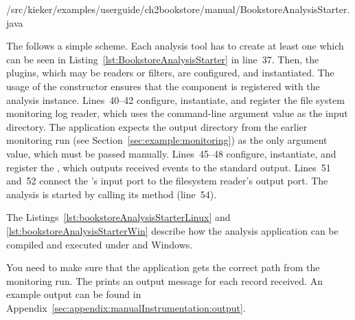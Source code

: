 \pagebreak

\setJavaCodeListing
%
{\manualInstrumentedBookstoreApplicationDir/src/kieker/examples/userguide/ch2bookstore/manual/BookstoreAnalysisStarter.java}


\noindent The  follows a simple scheme. Each %
analysis tool has to create at least one  which can be %
seen in Listing~\ref{lst:BookstoreAnalysisStarter} in line~37. Then, the plugins, %
which may be readers or filters, are configured, and instantiated. The usage of the  %
constructor ensures that the component is registered with the analysis instance. %
Lines~40--42 configure, instantiate, and register the file system monitoring %
log reader, which uses the command-line argument value as the input directory. %
The application expects the %
output directory from the earlier monitoring run (see Section~\ref{sec:example:monitoring}) %
as the only argument value, which must be passed manually. %
Lines~45--48 configure, instantiate, and register the , %
which outputs received events to the standard output. Lines~51 and~52 connect %
the 's input port to the filesystem reader's output port. %
The analysis is started by calling its  method (line~54). %


The Listings~\ref{lst:bookstoreAnalysisStarterLinux} and \ref{lst:bookstoreAnalysisStarterWin} %
describe how the analysis application can be compiled and executed under \UnixLikeSystems{} and Windows.

\setBashListing
\enlargethispage{1.0cm}




\noindent You need to make sure that the application gets the correct path from the monitoring run.
The  prints an output message for each record received. %
An example output can be found in Appendix~\ref{sec:appendix:manualInstrumentation:output}.

